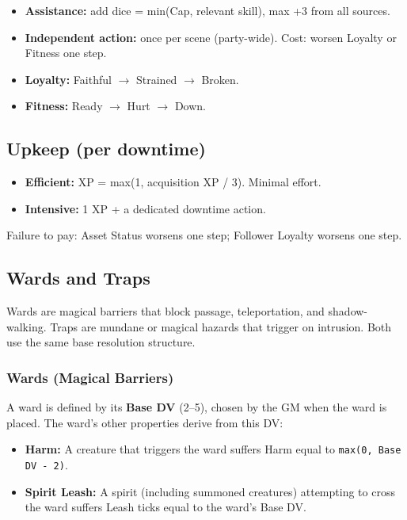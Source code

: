 \begin{itemize}
    \item \textbf{Assistance:} add dice = min(Cap, relevant skill), max +3 from
        all sources.
    \item \textbf{Independent action:} once per scene (party-wide). Cost: worsen
        Loyalty or Fitness one step.
    \item \textbf{Loyalty:} Faithful $\rightarrow$ Strained $\rightarrow$ Broken.
    \item \textbf{Fitness:} Ready $\rightarrow$ Hurt $\rightarrow$ Down.
\end{itemize}

\subsection{Upkeep (per downtime)}
\begin{itemize}
    \item \textbf{Efficient:} XP = max(1, acquisition XP / 3). Minimal effort.
    \item \textbf{Intensive:} 1 XP + a dedicated downtime action.
\end{itemize}
Failure to pay: Asset Status worsens one step; Follower Loyalty worsens one step.

\subsection{Wards and Traps}

Wards are magical barriers that block passage, teleportation, and shadow-walking. Traps are mundane or magical hazards that trigger on intrusion. Both use the same base resolution structure.

\subsubsection{Wards (Magical Barriers)}

A ward is defined by its \textbf{Base DV} (2--5), chosen by the GM when the ward is placed. The ward's other properties derive from this DV:

\begin{itemize}
    \item \textbf{Harm:} A creature that triggers the ward suffers Harm equal to \texttt{max(0, Base DV - 2)}.
    \item \textbf{Spirit Leash:} A spirit (including summoned creatures) attempting to cross the ward suffers Leash ticks equal to the ward's Base DV.
\end{itemize}


